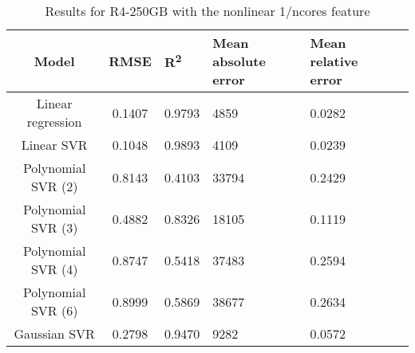 \begin{table}[H]
\centering
\begin{adjustbox}{center}
\begin{tabular}{c | c M{1.2cm} M{2.5cm} M{2.5cm} M{1.8cm}}
Model & RMSE & R\textsuperscript{2} & Mean absolute error & Mean relative error \tabularnewline
\hline
Linear regression & 0.1407 & 0.9793 &   4859 & 0.0282 \\
Linear SVR & 0.1048 & 0.9893 &   4109 & 0.0239 \\
Polynomial SVR (2) & 0.8143 & 0.4103 &  33794 & 0.2429 \\
Polynomial SVR (3) & 0.4882 & 0.8326 &  18105 & 0.1119 \\
Polynomial SVR (4) & 0.8747 & 0.5418 &  37483 & 0.2594 \\
Polynomial SVR (6) & 0.8999 & 0.5869 &  38677 & 0.2634 \\
Gaussian SVR & 0.2798 & 0.9470 &   9282 & 0.0572 \\
\end{tabular}
\end{adjustbox}
\\
\caption{Results for R4-250GB with the nonlinear 1/ncores feature}
\label{tab:all_nonlinear_R4_250}
\end{table}
